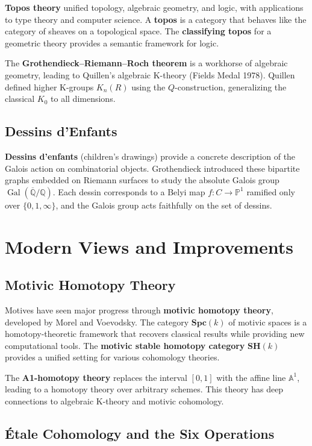 \textbf{Topos theory} unified topology, algebraic geometry, and logic, with
applications to type theory and computer science. A \textbf{topos} is a category
that behaves like the category of sheaves on a topological space. The
\textbf{classifying topos} for a geometric theory provides a semantic framework
for logic.

The \textbf{Grothendieck--Riemann--Roch theorem} is a workhorse of algebraic
geometry, leading to Quillen's algebraic K-theory (Fields Medal 1978). Quillen
defined higher K-groups $K_n(R)$ using the $Q$-construction, generalizing the
classical $K_0$ to all dimensions.

\subsection*{Dessins d'Enfants}

\textbf{Dessins d'enfants} (children's drawings) provide a concrete description
of the Galois action on combinatorial objects. Grothendieck introduced these
bipartite graphs embedded on Riemann surfaces to study the absolute Galois
group $\operatorname{Gal}(\overline{\mathbb{Q}}/\mathbb{Q})$. Each dessin
corresponds to a Belyi map $f: C \to \mathbb{P}^1$ ramified only over $\{0,
1, \infty\}$, and the Galois group acts faithfully on the set of dessins.

\section{Modern Views and Improvements}

\subsection*{Motivic Homotopy Theory}

Motives have seen major progress through \textbf{motivic homotopy theory},
developed by Morel and Voevodsky. The category $\mathbf{Spc}(k)$ of motivic
spaces is a homotopy-theoretic framework that recovers classical results while
providing new computational tools. The \textbf{motivic stable homotopy category}
$\mathbf{SH}(k)$ provides a unified setting for various cohomology theories.

The \textbf{A1-homotopy theory} replaces the interval $[0,1]$ with the
affine line $\mathbb{A}^1$, leading to a homotopy theory over arbitrary
schemes. This theory has deep connections to algebraic K-theory and
motivic cohomology.

\subsection*{Étale Cohomology and the Six Operations}

